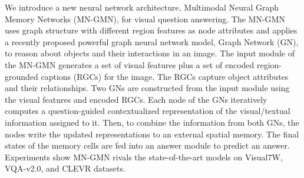 We introduce a new neural network architecture, Multimodal Neural Graph Memory Networks (MN-GMN), for visual question answering. The MN-GMN uses graph structure with different region features as node attributes and applies a recently proposed powerful graph neural network model, Graph Network (GN), to reason about objects and their interactions in an image. The input module of the MN-GMN generates a set of visual features plus a set of encoded region-grounded captions (RGCs) for the image. The RGCs capture object attributes and their relationships. Two GNs are constructed from the input module using the visual features and encoded RGCs. Each node of the GNs iteratively computes a question-guided contextualized representation of the visual/textual information assigned to it. Then, to combine the information from both GNs, the nodes write the updated representations to an external spatial memory. The final states of the memory cells are fed into an answer module to predict an answer. Experiments show MN-GMN rivals the state-of-the-art models on Visual7W, VQA-v2.0, and CLEVR datasets.
